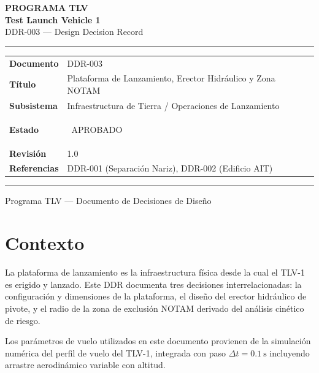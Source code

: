 \documentclass[11pt, a4paper]{article}
\newcommand{\status}[1]{\colorbox{tlvgreen}{\color{white}\small\bfseries\strut\ #1\ }}
\begin{document}
\begin{titlepage}
  \centering\vspace*{3cm}
  {\large\color{gray}\bfseries PROGRAMA TLV}\\[0.4cm]
  {\Huge\color{tlvblue}\bfseries Test Launch Vehicle 1}\\[0.3cm]
  {\Large\color{tlvmid} DDR-003 --- Design Decision Record}\\[2cm]
  \color{tlvrule}\hrule height 0.8pt\vspace{0.6cm}
  \begin{tabular}{L{4cm} L{9cm}}
    \textbf{Documento}  & DDR-003 \\
    \textbf{T\'{i}tulo} & Plataforma de Lanzamiento, Erector Hidr\'{a}ulico y Zona NOTAM \\
    \textbf{Subsistema} & Infraestructura de Tierra / Operaciones de Lanzamiento \\
    \textbf{Estado}     & \status{APROBADO} \\
    \textbf{Revisi\'{o}n} & 1.0 \\
    \textbf{Referencias} & DDR-001 (Separaci\'{o}n Nariz), DDR-002 (Edificio AIT) \\
  \end{tabular}
  \vspace{0.6cm}\color{tlvrule}\hrule height 0.8pt
  \vfill
  {\small\color{gray} Programa TLV --- Documento de Decisiones de Dise\~{n}o}
\end{titlepage}

\section{Contexto}

La plataforma de lanzamiento es la infraestructura f\'{i}sica desde la cual el TLV-1 es erigido y lanzado. Este DDR documenta tres decisiones interrelacionadas: la configuraci\'{o}n y dimensiones de la plataforma, el dise\~{n}o del erector hidr\'{a}ulico de pivote, y el radio de la zona de exclusi\'{o}n NOTAM derivado del an\'{a}lisis cin\'{e}tico de riesgo.

Los par\'{a}metros de vuelo utilizados en este documento provienen de la simulaci\'{o}n num\'{e}rica del perfil de vuelo del TLV-1, integrada con paso $\Delta t = 0.1\ \text{s}$ incluyendo arrastre aerodin\'{a}mico variable con altitud.
\end{document}
